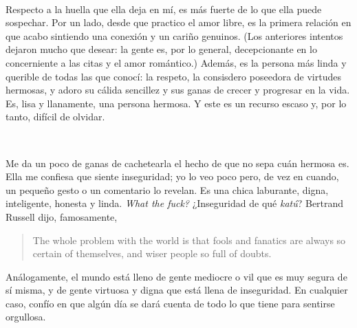 \documentclass[a4paper, 12pt]{article}
\begin{document}
~ 

Respecto a la huella que ella deja en mí, es más fuerte de lo que ella puede
sospechar. Por un lado, desde que practico el amor libre, es la primera
relación en que acabo sintiendo una conexión y un cariño genuinos. (Los
anteriores intentos dejaron mucho que desear: la gente es, por lo general,
decepcionante en lo concerniente a las citas y el amor romántico.) Además, es
la persona más linda y querible de todas las que conocí: la respeto, la
consisdero poseedora de virtudes hermosas, y adoro su cálida sencillez y sus
ganas de crecer y progresar en la vida. Es, lisa y llanamente, una persona 
hermosa. Y este es un recurso escaso y, por lo tanto, difícil de olvidar.

~ 

Me da un poco de ganas de cachetearla el hecho de que no sepa cuán hermosa es.
Ella me confiesa que siente inseguridad; yo lo veo poco pero, de vez en cuando,
un pequeño gesto o un comentario lo revelan. Es una chica laburante, digna, 
inteligente, honesta y linda. \textit{What the fuck?} ¿Inseguridad de qué \textit{katú}?
Bertrand Russell dijo, famosamente,

\begin{quote}
    The whole problem with the world is that fools and fanatics are always so certain of themselves, and wiser people so full of doubts.
\end{quote}

Análogamente, el mundo está lleno de gente mediocre o vil que es muy segura de
sí misma, y de gente virtuosa y digna que está llena de inseguridad. En
cualquier caso, confío en que algún día se dará cuenta de todo lo que tiene
para sentirse orgullosa.
\end{document}
